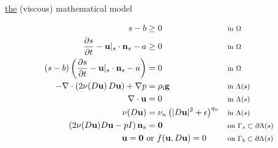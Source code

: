 \documentclass[10pt,dvipsnames]{beamer}
\newcommand{\bg}{\mathbf{g}}
\newcommand{\bn}{\mathbf{n}}
\newcommand{\bu}{\mathbf{u}}
\newcommand{\bzero}{\bm{0}}
\newcommand{\eps}{\epsilon}
\newcommand{\rhoi}{\rho_{\text{i}}}
\begin{document}
\newcommand{\where}[1]{\text{\footnotesize #1}}

\begin{frame}{\underline{the} (viscous) mathematical model}

\begin{align*}
s - b &\ge 0 & &\where{in $\Omega$} \\
\frac{\partial s}{\partial t} - \bu|_s \cdot \bn_s - a &\ge 0 & &\where{in $\Omega$} \\
(s - b) \left(\frac{\partial s}{\partial t} - \bu|_s \cdot \bn_s - a\right) &= 0 & &\where{in $\Omega$} \\
- \nabla \cdot \left(2 \nu(D\bu)\, D\bu\right) + \nabla p &= \rhoi \bg && \where{in $\Lambda(s)$} \\
\nabla \cdot \bu &= 0 && \where{in $\Lambda(s)$} \\
\nu(D\bu) &= \nu_n \left(|D\bu|^2 + \eps\right)^{q_n} && \where{in $\Lambda(s)$} \\
\left(2 \nu(D\bu) D\bu - pI\right) \bn_s &= \bzero && \where{on $\Gamma_s \subset \partial\Lambda(s)$} \\
\bu  = \bzero \text{ } &\text{or } f(\bu,D\bu)=0 && \where{on $\Gamma_b \subset \partial\Lambda(s)$}
\end{align*}
\end{frame}
\end{document}
